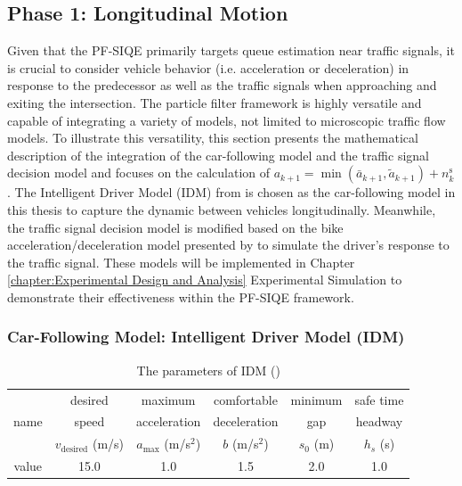 \subsection{Phase 1: Longitudinal Motion}\label{Longitudinal}
Given that the PF-SIQE primarily targets queue estimation near traffic signals, it is crucial to consider vehicle behavior (i.e. acceleration or deceleration) in response to the predecessor as well as the traffic signals when approaching and exiting the intersection. The particle filter framework is highly versatile and capable of integrating a variety of models, not limited to microscopic traffic flow models. To illustrate this versatility, this section presents the mathematical description of the integration of the car-following model and the traffic signal decision model and focuses on the calculation of $a_{k+1} = \min (\bar a_{k+1}, \tilde a_{k+1}) +  n_k^\text{s}$. The Intelligent Driver Model (IDM) from \textcite{treiber2000congested} is chosen as the car-following model in this thesis to capture the dynamic between vehicles longitudinally. Meanwhile, the traffic signal decision model is modified based on the bike acceleration/deceleration model presented by \textcite{dabiri2020optimized} to simulate the driver's response to the traffic signal. These models will be implemented in Chapter \ref{chapter:Experimental Design and Analysis} Experimental Simulation to demonstrate their effectiveness within the PF-SIQE framework.


\subsubsection{Car-Following Model: Intelligent Driver Model (IDM)}\label{car-following model: IDM}

\begin{table}[htbp]
\small
    \centering
    \begin{tabular}{cccccc}
    \toprule
         & desired  & maximum   & comfortable   & minimum   & safe time   \\
         name & speed  &  acceleration  &  deceleration  &  gap  &  headway  \\
         & \(v_{\text{desired}}\) (m/s) & $a_{\text{max}}$ (m/s$^2$)& $b$ (m/s$^2$) & $s_0$ (m) & $h_s$ (s) \\
        \hline
         value & 15.0 & 1.0 & 1.5 & 2.0 & 1.0 \\
         \toprule
    \end{tabular}
    \caption{The parameters of IDM (\textcite{treiber2013traffic})}
    \label{parameters of IDM}
\end{table}


